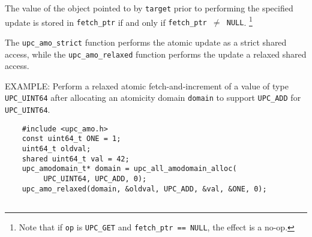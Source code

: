 \np The value of the object pointed to by {\tt target} prior to performing
    the specified update is stored in {\tt fetch\_ptr} if and only if
    {\tt fetch\_ptr $\neq$ NULL}.%
    \footnote{Note that if {\tt op} is {\tt UPC\_GET} and
              {\tt fetch\_ptr == NULL}, the effect is a no-op.}

\np The {\tt upc\_amo\_strict} function performs the atomic update as a strict
    shared access, while the {\tt upc\_amo\_relaxed} function performs the
    update a relaxed shared access.

\np EXAMPLE: Perform a relaxed atomic fetch-and-increment of a value of type
    {\tt UPC\_UINT64} after allocating an atomicity domain {\tt domain} to
    support {\tt UPC\_ADD} for {\tt UPC\_UINT64}.
\begin{verbatim}
    #include <upc_amo.h>
    const uint64_t ONE = 1;
    uint64_t oldval;
    shared uint64_t val = 42;
    upc_amodomain_t* domain = upc_all_amodomain_alloc(
         UPC_UINT64, UPC_ADD, 0);
    upc_amo_relaxed(domain, &oldval, UPC_ADD, &val, &ONE, 0);
    
\end{verbatim}
